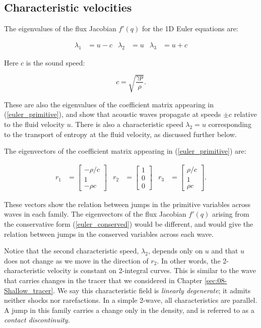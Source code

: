 \documentclass{SIAMbook2016}
\begin{document}
\hypertarget{characteristic-velocities}{%
\subsection{Characteristic velocities}\label{characteristic-velocities}}

The eigenvalues of the flux Jacobian \(f'(q)\) for the 1D Euler
equations are:

\begin{align}
\lambda_1 & = u-c & \lambda_2 & = u & \lambda_3 & = u+c
\end{align}

Here \(c\) is the sound speed:

\[ c = \sqrt{\frac{\gamma p}{\rho}}.\]

These are also the eigenvalues of the coefficient matrix appearing in
(\ref{euler_primitive}), and show that acoustic waves propagate at
speeds \(\pm c\) relative to the fluid velocity \(u\). There is also a
characteristic speed \(\lambda_2 =u\) corresponding to the transport of
entropy at the fluid velocity, as discussed further below.

The eigenvectors of the coefficient matrix appearing in
(\ref{euler_primitive}) are:

\begin{align}\label{euler_evecs}
r_1 & = \begin{bmatrix} -\rho/c \\ 1 \\ - \rho c \end{bmatrix} &
r_2 & = \begin{bmatrix} 1 \\ 0 \\ 0 \end{bmatrix} &
r_3 & = \begin{bmatrix}  \rho/c \\ 1 \\ \rho c \end{bmatrix}.
\end{align}

These vectors show the relation between jumps in the primitive variables
across waves in each family. The eigenvectors of the flux Jacobian
\(f'(q)\) arising from the conservative form (\ref{euler_conserved})
would be different, and would give the relation between jumps in the
conserved variables across each wave.

Notice that the second characteristic speed, \(\lambda_2\), depends only
on \(u\) and that \(u\) does not change as we move in the direction of
\(r_2\). In other words, the 2-characteristic velocity is constant on
2-integral curves. This is similar to the wave that carries changes in
the tracer that we considered in Chapter \ref{sec:08-Shallow_tracer}. We
say this characteristic field is \emph{linearly degenerate}; it admits
neither shocks nor rarefactions. In a simple 2-wave, all characteristics
are parallel. A jump in this family carries a change only in the
density, and is referred to as a \emph{contact discontinuity}.
\end{document}
